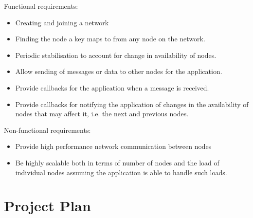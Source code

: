 \documentclass{article}
\begin{document}
Functional requirements:
\begin{itemize}
\item
Creating and joining a network
\item
Finding the node a key maps to from any node on the network.
\item
Periodic stabilisation to account for change in availability of nodes.
\item
Allow sending of messages or data to other nodes for the application.
\item
Provide callbacks for the application when a message is received.
\item
Provide callbacks for notifying the application of changes in the availability of nodes that may affect it, i.e. the next and previous nodes.
\end{itemize}


Non-functional requirements:
\begin{itemize}
\item
Provide high performance network communication between nodes
\item
Be highly scalable both in terms of number of nodes and the load of individual nodes assuming the application is able to handle such loads.
\end{itemize}

\section{Project Plan}
\end{document}
